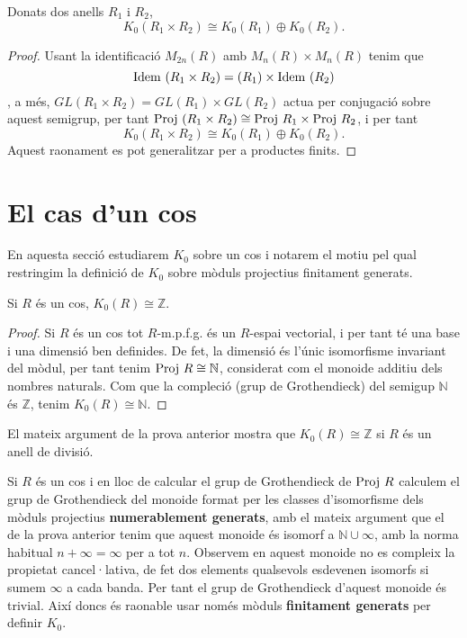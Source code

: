 \begin{cor} \label{K0Cartesian}
Donats dos anells $R_1$ i $R_2$,
$$
K_0(R_1\times R_2) \cong K_0(R_1) \oplus K_0(R_2).
$$ 
\end{cor}
\begin{proof}
Usant la identificació $M_{2n}(R)$ amb $M_{n}(R)\times M_n(R)$ tenim que
$$\mathrm{Idem} \ (R_1\times R_2) = (R_1) \times \mathrm{Idem} \  (R_2)$$, a més, $GL(R_1\times R_2) = GL(R_1)\times GL(R_2)$ actua per conjugació sobre aquest semigrup, per tant $\mathrm{Proj} \  (R_1\times R_2) \cong \mathrm{Proj} \  R_1 \times \mathrm{Proj} \  R_2$, i per tant $$K_0(R_1\times R_2) \cong K_0(R_1) \oplus K_0(R_2).$$ Aquest raonament es pot generalitzar per a productes finits.
\end{proof}
\section{El cas d'un cos}
En aquesta secció estudiarem $K_0$ sobre un cos i notarem el motiu pel qual restringim la definició de $K_0$ sobre mòduls projectius finitament generats.
\begin{prop}
 Si $R$ és un cos, $K_0(R)\cong \mathbb{Z}$.
\end{prop}
\begin{proof}
Si $R$ és un cos tot $R$-m.p.f.g. és un $R$-espai vectorial, i per tant té una base i una dimensió ben definides. De fet, la dimensió és l'únic isomorfisme invariant del mòdul, per tant tenim $\mathrm{Proj} \  R \cong \mathbb{N}$, considerat com el monoide additiu dels nombres naturals. Com que la compleció (grup de Grothendieck) del semigup $\mathbb{N}$ és $\mathbb{Z}$, tenim $K_0(R)\cong \mathbb{N}$.
\end{proof}
\begin{obs}
El mateix argument de la prova anterior mostra que $K_0(R)\cong \mathbb{Z}$ si $R$ és un anell de divisió.
\end{obs}
\begin{obs}
Si $R$ és un cos i en lloc de calcular el grup de Grothendieck de $\mathrm{Proj} \  R$ calculem el grup de Grothendieck del monoide format per les classes d'isomorfisme dels mòduls projectius \textbf{numerablement generats}, amb el mateix argument que el de la prova anterior tenim que aquest monoide és isomorf a $\mathbb{N} \cup \infty$, amb la norma habitual $n+\infty = \infty$ per a tot $n$. Observem en aquest monoide no es compleix la propietat cancel·lativa, de fet dos elements qualsevols esdevenen isomorfs si sumem $\infty$ a cada banda. Per tant el grup de Grothendieck d'aquest monoide és trivial. Així doncs és raonable usar només mòduls \textbf{finitament generats} per definir $K_0$.
\end{obs}

